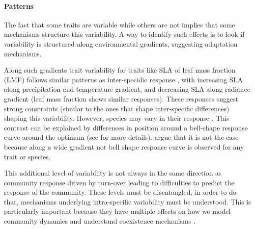 


\paragraph{Patterns}

The fact that some traits are variable while others are not implies that some mechanisms structure this variability.
A way to identify such effects is to look if variability is structured along environmental gradients, suggesting adaptation mechanisms.

Along such gradients trait variability for traits like SLA \parencite{poorter_causes_2009} of leaf mass fraction (LMF) \parencite{poorter_biomass_2012} follows similar patterns as inter-specidic response \parencite{niinemets_global-scale_2001}, with increasing SLA along precipitation and temperature gradient, and decreasing SLA along radiance gradient (leaf mass fraction shows similar responses). These responses suggest strong constraints (similar to the ones that shape inter-specific differences) shaping this variability. However, species may vary in their response \parencite{kichenin_contrasting_2013}. This contrast can be explained by differences in position around a bell-shape response curve around the optimum (see \cite{albert_intraspecific_2010} for more details). \cite{kichenin_contrasting_2013} argue that it is not the case because along a wide gradient not bell shape response curve is observed for any trait or species.

This additional level of variability is not always in the same direction as community response driven by turn-over \parencite{albert_intraspecific_2010, kichenin_contrasting_2013, jung_intraspecific_2014} leading to difficulties to predict the response of the community. These levels must be disentangled, in order to do that, mechanisms underlying intra-specific variability must be understood. This is particularly important because they have multiple effects on how we model community dynamics and understand coexistence mechanisms \cite{bolnick_why_2011, violle_return_2012}.
%
%
%
%

